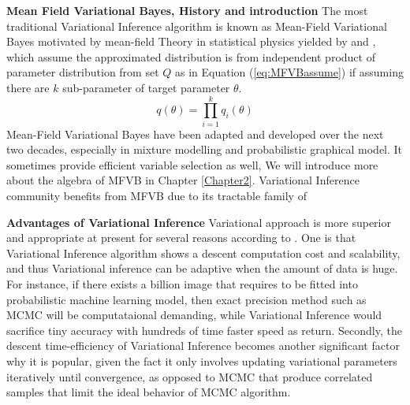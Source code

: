 \textbf{Mean Field Variational Bayes, History and introduction}
The most traditional Variational Inference algorithm is known as Mean-Field Variational Bayes motivated by mean-field Theory in statistical physics yielded by 
\cite{jordan_ghahramani_jaakkola_saul_1998} and \cite{attias_1999}, which assume the approximated distribution is from independent product of parameter distribution from set $Q$ as in Equation (\ref{eq:MFVBassume}) if assuming there are $k$ sub-parameter of target parameter $\theta$.
\begin{equation}
	\label{eq:MFVBassume}
	q(\theta) = \prod_{i=1}^{k} q_i(\theta)
\end{equation}
Mean-Field Variational Bayes have been adapted and developed over the next two decades, especially in mixture modelling and probabilistic graphical model. It sometimes provide efficient variable selection as well, We will introduce more about the algebra of MFVB in Chapter \ref{Chapter2}. Variational Inference community benefits from MFVB due to its tractable family of 

\textbf{Advantages of Variational Inference}
Variational approach is more superior and appropriate at present for several reasons according to \cite{blei_kucukelbir_mcauliffe_2017}. One is that Variational Inference algorithm shows a descent computation cost and scalability, and thus Variational inference can be adaptive when the amount of data is huge. For instance, if there exists a billion image that requires to be fitted into probabilistic machine learning model, then exact precision method such as MCMC will be computataional demanding, while Variational Inference would sacrifice tiny accuracy with hundreds of time faster speed as return.
Secondly, the descent time-efficiency of Variational Inference becomes another significant factor why it is popular, given the fact it only involves updating variational parameters iteratively until convergence, as opposed to MCMC that produce correlated samples that limit the ideal behavior of MCMC algorithm.

